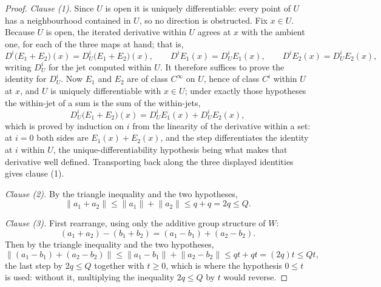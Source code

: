 \begin{proof}
\emph{Clause (1).}  Since $U$ is open it is uniquely differentiable: every point of $U$ has a
neighbourhood contained in $U$, so no direction is obstructed.  Fix $x\in U$.  Because $U$ is
open, the iterated derivative within $U$ agrees at $x$ with the ambient one, for each of the
three maps at hand; that is,
\[
  D^{i}\bigl(E_1+E_2\bigr)(x)=D^{i}_{U}\bigl(E_1+E_2\bigr)(x),
  \qquad
  D^{i}E_1(x)=D^{i}_{U}E_1(x),
  \qquad
  D^{i}E_2(x)=D^{i}_{U}E_2(x),
\]
writing $D^{i}_{U}$ for the jet computed within $U$.  It therefore suffices to prove the identity
for $D^{i}_{U}$.  Now $E_1$ and $E_2$ are of class $C^{\infty}$ on $U$, hence of class $C^{i}$
within $U$ at $x$, and $U$ is uniquely differentiable with $x\in U$; under exactly those
hypotheses the within-jet of a sum is the sum of the within-jets,
\[
  D^{i}_{U}\bigl(E_1+E_2\bigr)(x)=D^{i}_{U}E_1(x)+D^{i}_{U}E_2(x),
\]
which is proved by induction on $i$ from the linearity of the derivative within a set: at $i=0$
both sides are $E_1(x)+E_2(x)$, and the step differentiates the identity at $i$ within $U$, the
unique-differentiability hypothesis being what makes that derivative well defined.  Transporting
back along the three displayed identities gives clause (1).

\medskip\noindent\emph{Clause (2).}  By the triangle inequality and the two hypotheses,
\[
  \lVert a_1+a_2\rVert\le\lVert a_1\rVert+\lVert a_2\rVert\le q+q=2q\le Q .
\]

\medskip\noindent\emph{Clause (3).}  First rearrange, using only the additive group structure of
$W$:
\[
  (a_1+a_2)-(b_1+b_2)=(a_1-b_1)+(a_2-b_2).
\]
Then by the triangle inequality and the two hypotheses,
\[
  \bigl\lVert(a_1-b_1)+(a_2-b_2)\bigr\rVert
  \le\lVert a_1-b_1\rVert+\lVert a_2-b_2\rVert
  \le qt+qt=(2q)t\le Qt ,
\]
the last step by $2q\le Q$ together with $t\ge0$, which is where the hypothesis $0\le t$ is used:
without it, multiplying the inequality $2q\le Q$ by $t$ would reverse.
\end{proof}
